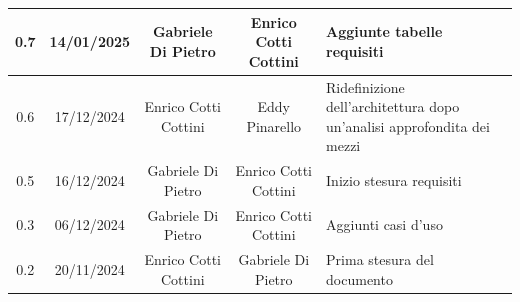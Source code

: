 \documentclass{article}
\begin{document}
\begin{table}[h]
\begin{tabular}{|c|c|c|c|m{}|}
        \hline
        0.7 & 14/01/2025 & Gabriele Di Pietro & Enrico Cotti Cottini & Aggiunte tabelle requisiti \\
        \hline
        0.6 & 17/12/2024 & Enrico Cotti Cottini & Eddy Pinarello & Ridefinizione dell'architettura dopo un'analisi approfondita dei mezzi \\
        \hline
        0.5 & 16/12/2024 & Gabriele Di Pietro & Enrico Cotti Cottini & Inizio stesura requisiti \\
        \hline
        0.3 & 06/12/2024 & Gabriele Di Pietro & Enrico Cotti Cottini & Aggiunti casi d'uso \\
        \hline
        0.2 & 20/11/2024 & Enrico Cotti Cottini & Gabriele Di Pietro & Prima stesura del documento \\
        \hline
    \end{tabular}
\end{table}


\newpage
\tableofcontents
\listoftables
\listoffigures

\newpage



\newpage



\newpage



\newpage


\end{document}
